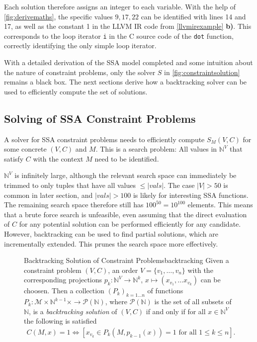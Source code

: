     Each solution therefore assigns an integer to each variable.
    With the help of \autoref{fig:derivemaths}, the specific values $9,17,22$
    can be identified with lines 14 and 17, as well as the constant 1 in the
    LLVM IR code from \autoref{llvmirexample} {\bf b)}.
    This corresponds to the loop iterator \texttt{i} in the C source code of the
    \texttt{dot} function, correctly identifying the only simple loop iterator.

    With a detailed derivation of the SSA model completed and some intuition
    about the nature of constraint problems, only the solver $S$ in
    \autoref{fig:constraintsolution} remains a black box.
    The next sections derive how a backtracking solver can
    be used to efficiently compute the set of solutions.

\subsection{Solving of SSA Constraint Problems}

    A solver for SSA constraint problems needs to efficiently compute $S_M(V,C)$
    for some concrete $(V,C)$ and $M$.
    This is a search problem:
    All values in $\mathbb N^V$ that satisfy $C$ with the context $M$ need to
    be identified.

    $\mathbb N^V$ is infinitely large, although the relevant search space can
    immediately be trimmed to only tuples that have all values $\leq|vals|$.
    The case \mbox{$|V|>50$} is common in later section, and \mbox{$|vals|>100$}
    is likely for interesting SSA functions.
    The remaining search space therefore still has $100^{50}=10^{100}$ elements.
    This means that a brute force search is unfeasible, even assuming that
    the direct evaluation of $C$ for any potential solution can be performed
    efficiently for any candidate.
    However, backtracking can be used to find partial solutions, which are
    incrementally extended.
    This prunes the search space more effectively.

\begin{figure}[h]
    \begin{definition}{Backtracking Solution of Constraint Problems}{backtracking}
        Given a constraint problem $(V,C)$, an order $V=\{v_1,\dots,v_n\}$ with
        the corresponding projections $p_k\colon\mathbb N^V\rightarrow\mathbb N^k$,
        $x\mapsto(x_{v_1},\dots x_{v_k})$ can be choosen.
        Then a collection $(P_k)_{k=1\dots n}$ of functions
        $P_k:\mathcal M\times \mathbb N^{k-1}\times\rightarrow\mathcal P(\mathbb N)$,
        where $\mathcal P(\mathbb N)$ is the set of all subsets of $\mathbb N$,
        is a {\em backtracking solution} of $(V,C)$ if and only if for all
        $x\in\mathbb N^V$ the following is satisfied
        \begin{align}
            C(M,x)=1\iff\left[x_{v_k}\in P_k(M,p_{k-1}(x))=1\text{ for all }1\leq k\leq n\right].
        \end{align}
    \end{definition}
\end{figure}

